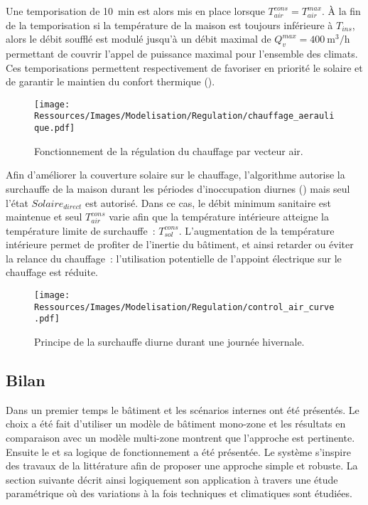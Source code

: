 Une temporisation de \SI{10}{min} est alors mis en place lorsque $T_{air}^{cons} = T_{air}^{max}$.
À la fin de la temporisation si la température de la maison est
toujours inférieure à $T_{ins}$, alors le débit soufflé est modulé jusqu’à un débit maximal de
$Q_{v}^{max} = \SI[per-mode=symbol]{400}{\meter\cubed\per\hour}$ permettant de couvrir
l’appel de puissance maximal pour l’ensemble des climats. Ces
temporisations permettent respectivement de favoriser en priorité le solaire et de
garantir le maintien du confort thermique ().

\begin{figure}
    \centering
    \texttt{[image: Ressources/Images/Modelisation/Regulation/chauffage\_aeraulique.pdf]}
    \caption[Fonctionnement de la régulation du chauffage par vecteur air]
            {Fonctionnement de la régulation du chauffage par vecteur air.}
    \label{fig:chauffage_aeraulique}
\end{figure}

Afin d’améliorer la couverture solaire sur le chauffage, l’algorithme autorise la
surchauffe de la maison durant les périodes d’inoccupation diurnes
() mais seul l’état $Solaire_{direct}$ est autorisé. Dans ce
cas, le débit minimum sanitaire est maintenue et seul $T_{air}^{cons}$ varie afin que la
température intérieure atteigne la température limite de surchauffe~: $T^{cons}_{sol}$.
L’augmentation de la température intérieure permet de profiter de l’inertie du bâtiment, et
ainsi retarder ou éviter la relance du chauffage~: l’utilisation potentielle de
l’appoint électrique sur le chauffage est réduite.
\begin{figure}
    \centering
    \texttt{[image: Ressources/Images/Modelisation/Regulation/control\_air\_curve.pdf]}
    \caption[Principe de la surchauffe diurne durant une journée hivernale]
            {Principe de la surchauffe diurne durant une journée hivernale.}
    \label{fig:control_air}
\end{figure}


\subsection{Bilan} %
\label{sub:bilan}
Dans un premier temps le bâtiment et les scénarios internes ont été présentés. Le
choix a été fait d’utiliser un modèle de bâtiment mono-zone et les résultats en
comparaison avec un modèle multi-zone montrent que l’approche est pertinente. Ensuite
le  et sa logique de fonctionnement a été présentée. Le système s’inspire
des travaux de la littérature afin de proposer une approche simple et robuste.
La section suivante décrit ainsi logiquement son application à travers une étude
paramétrique où des variations à la fois techniques et climatiques sont étudiées.







